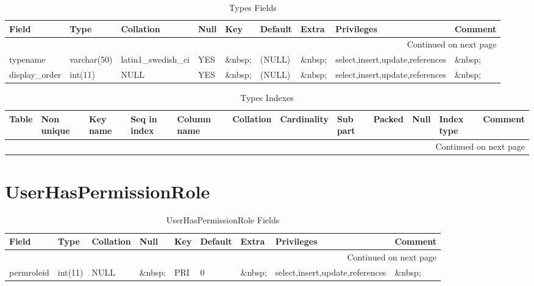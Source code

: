 \documentclass[tablesignature]{scrartcl}
\begin{document}
\begin{longtable}{|l|l|l|l|l|l|l|l|l|}
\caption{Types Fields} \label{tbl:typesfields}\\
\hline
 Field             &  Type         &  Collation                &  Null     &  Key      &  Default  &  Extra              &  Privileges                       &  Comment \\
\hline
\endhead
\hline\multicolumn{9}{r}{Continued on next page}\
\endfoot
\endlastfoot
\hline
 typeid            &  int(11)      &  NULL                     &  \&nbsp;  &  PRI      &  (NULL)   &  auto\_{}increment  &  select,insert,update,references  &  \&nbsp;  \\
 typename          &  varchar(50)  &  latin1\_{}swedish\_{}ci  &  YES      &  \&nbsp;  &  (NULL)   &  \&nbsp;            &  select,insert,update,references  &  \&nbsp;  \\
 display\_{}order  &  int(11)      &  NULL                     &  YES      &  \&nbsp;  &  (NULL)   &  \&nbsp;            &  select,insert,update,references  &  \&nbsp;  \\
\hline
\end{longtable}


\begin{longtable}{|l|l|l|l|l|l|l|l|l|l|l|l|}
\caption{Types Indexes} \label{tbl:typesindexes}\\
\hline
 Table  &  Non unique  &  Key name  &  Seq in index  &  Column name  &  Collation  &  Cardinality  &  Sub part  &  Packed  &  Null     &  Index type  &  Comment \\
\hline
\endhead
\hline\multicolumn{12}{r}{Continued on next page}\
\endfoot
\endlastfoot
\hline
 Types  &           0  &  PRIMARY   &             1  &  typeid       &  A          &           16  &  (NULL)    &  (NULL)  &  \&nbsp;  &  BTREE       &  \&nbsp;  \\
\hline
\end{longtable}
\section{UserHasPermissionRole}
\label{sec-34}


\begin{longtable}{|l|l|l|l|l|l|l|l|l|}
\caption{UserHasPermissionRole Fields} \label{tbl:userhaspermissionrolefields}\\
\hline
 Field       &  Type         &  Collation                &  Null     &  Key  &  Default  &  Extra    &  Privileges                       &  Comment \\
\hline
\endhead
\hline\multicolumn{9}{r}{Continued on next page}\
\endfoot
\endlastfoot
\hline
 badgeid     &  varchar(15)  &  latin1\_{}swedish\_{}ci  &  \&nbsp;  &  PRI  &  \&nbsp;  &  \&nbsp;  &  select,insert,update,references  &  \&nbsp;  \\
 permroleid  &  int(11)      &  NULL                     &  \&nbsp;  &  PRI  &  0        &  \&nbsp;  &  select,insert,update,references  &  \&nbsp;  \\
\hline
\end{longtable}
\end{document}
